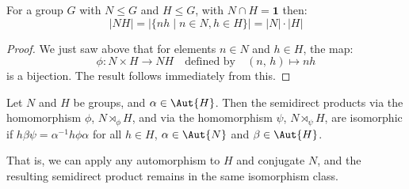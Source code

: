 \begin{lemma}\label{lem:setprodorder}
    For a group \(G\) with \(N \leqslant G\) and \(H \leqslant G\), with \(N \cap H = \bm{1}\) then:
    \[|NH| = |\{nh \mid n \in N, h \in H\}| = |N| \cdot |H|\]
\end{lemma}

\begin{proof}
    We just saw above that for elements \(n \in N\) and \(h \in H\), the map:
    \[\phi:N \times H \to NH \quad \text{defined by} \quad (n,\,h) \mapsto nh\]
    is a bijection.
    The result follows immediately from this.
\end{proof}

\begin{lemma}\label{lem:semiisom}
    Let \(N\) and \(H\) be groups, and \(\alpha \in \Aut{H}\).
    Then the semidirect products via the homomorphism \(\phi\), \(N \rtimes_\phi H\), and via the homomorphism
    \(\psi\), \(N \rtimes_\psi H\), are isomorphic if \(h\beta\psi = \alpha^{-1}h\phi\alpha\) for all \(h \in H\),
    \(\alpha \in \Aut{N}\) and \(\beta \in \Aut{H}\).

    That is, we can apply any automorphism to \(H\) and conjugate \(N\), and the resulting semidirect product remains in
    the same isomorphism class.
\end{lemma}

